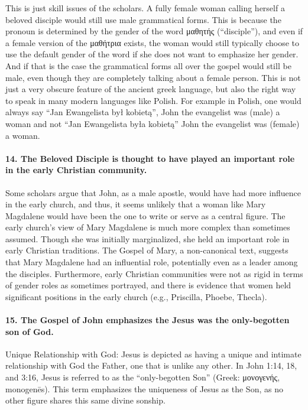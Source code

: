 This is just skill issues of the scholars.
A fully female woman calling herself a beloved disciple would still use male grammatical forms.
This is because the pronoun is determined by the gender of the word μαθητής (``disciple''), and even if a female version of the μαθήτρια exists, the woman would still typically choose to use the default gender of the word if she does not want to emphasize her gender.
And if that is the case the grammatical forms all over the gospel would still be male, even though they are completely talking about a female person.
This is not just a very obscure feature of the ancient greek language, but also the right way to speak in many modern languages like Polish.
For example in Polish, one would always say ``Jan Ewangelista był kobietą'', John the evangelist was (male) a woman and not ``Jan Ewangelista była kobietą'' John the evangelist was (female) a woman.

\paragraph{14.
The Beloved Disciple is thought to have played an important role in the early Christian community.}\label{par:the-beloved-disciple-is-thought-to-have-played-an-important-role-in-the-early-christian-community.}

Some scholars argue that John, as a male apostle, would have had more influence in the early church, and thus, it seems unlikely that a woman like Mary Magdalene would have been the one to write or serve as a central figure.
The early church's view of Mary Magdalene is much more complex than sometimes assumed.
Though she was initially marginalized, she held an important role in early Christian traditions.
The Gospel of Mary, a non-canonical text, suggests that Mary Magdalene had an influential role, potentially even as a leader among the disciples.
Furthermore, early Christian communities were not as rigid in terms of gender roles as sometimes portrayed, and there is evidence that women held significant positions in the early church (e.g., Priscilla, Phoebe, Thecla).

\paragraph{15.
The Gospel of John emphasizes the Jesus was the only-begotten son of God.}\label{par:the-gospel-of-john-emphasizes-the-jesus-was-the-only-begotten-son-of-god.}

Unique Relationship with God: Jesus is depicted as having a unique and intimate relationship with God the Father, one that is unlike any other.
In John 1:14, 18, and 3:16, Jesus is referred to as the ``only-begotten Son'' (Greek: μονογενής, monogenēs).
This term emphasizes the uniqueness of Jesus as the Son, as no other figure shares this same divine sonship.

